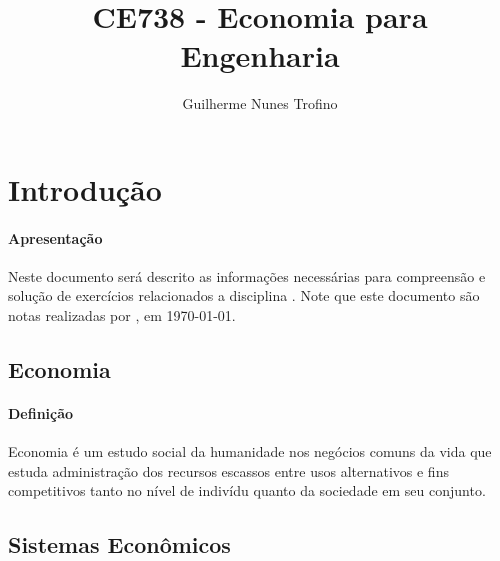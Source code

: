 \documentclass{article}
\title{CE738 - Economia para Engenharia}
\author{Guilherme Nunes Trofino}
\begin{document}
    \maketitle
\newpage

    \tableofcontents
\newpage

    \section{Introdução}
        \paragraph{Apresentação}Neste documento será descrito as informações necessárias para compreensão e solução de exercícios relacionados a disciplina \thetitle . Note que este documento são notas realizadas por \theauthor , em \today.

        \subsection{Economia}
            \paragraph{Definição}Economia é um estudo social da humanidade nos negócios comuns da vida que estuda administração dos recursos escassos entre usos alternativos e fins competitivos tanto no nível de indivídu quanto da sociedade em seu conjunto.

        \subsection{Sistemas Econômicos}
\end{document}
